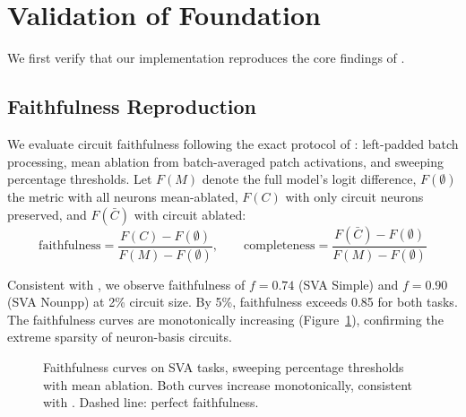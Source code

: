\documentclass[11pt]{article}
\begin{document}
\section{Validation of Foundation}
\label{sec:validation}

We first verify that our implementation reproduces the core findings of \citet{arora2025circuits}.

\subsection{Faithfulness Reproduction}
\label{sec:faithfulness}

We evaluate circuit faithfulness following the exact protocol of \citet{arora2025circuits}: left-padded batch processing, mean ablation from batch-averaged patch activations, and sweeping percentage thresholds.
Let $F(M)$ denote the full model's logit difference, $F(\emptyset)$ the metric with all neurons mean-ablated, $F(C)$ with only circuit neurons preserved, and $F(\bar{C})$ with circuit ablated:
\begin{equation}
    \text{faithfulness} = \frac{F(C) - F(\emptyset)}{F(M) - F(\emptyset)}, \qquad
    \text{completeness} = \frac{F(\bar{C}) - F(\emptyset)}{F(M) - F(\emptyset)}
\end{equation}

Consistent with \citet{arora2025circuits}, we observe faithfulness of $f{=}0.74$ (SVA Simple) and $f{=}0.90$ (SVA Nounpp) at 2\% circuit size.
By 5\%, faithfulness exceeds 0.85 for both tasks.
The faithfulness curves are monotonically increasing (Figure~\ref{fig:faithfulness}), confirming the extreme sparsity of neuron-basis circuits.

\begin{figure}[h]
\centering
{}
\caption{Faithfulness curves on SVA tasks, sweeping percentage thresholds with mean ablation. Both curves increase monotonically, consistent with \citet{arora2025circuits}. Dashed line: perfect faithfulness.}
\label{fig:faithfulness}
\end{figure}
\end{document}
